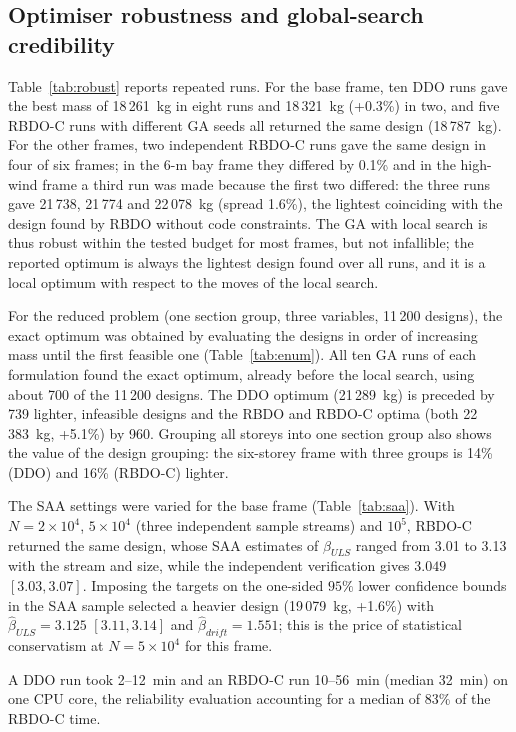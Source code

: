 \subsection{Optimiser robustness and global-search credibility}\label{sec:robust}

Table~\ref{tab:robust} reports repeated runs. For the base frame, ten DDO runs gave the best mass
of 18\,261~kg in eight runs and 18\,321~kg (+0.3\%) in two, and five RBDO-C runs with different
GA seeds all returned the same design (18\,787~kg). For the other frames, two independent
RBDO-C runs gave the same design in four of six frames; in the 6-m bay frame they differed by
0.1\% and in the high-wind frame a third run was made because the first two differed: the three
runs gave 21\,738, 21\,774 and 22\,078~kg (spread 1.6\%), the lightest coinciding with the design
found by RBDO without code constraints. The GA with local search is thus robust within the
tested budget for most frames, but not infallible; the reported optimum is always the lightest
design found over all runs, and it is a local optimum with respect to the moves of the local search.

For the reduced problem (one section group, three variables, 11\,200 designs), the exact optimum
was obtained by evaluating the designs in order of increasing mass until the first feasible one
(Table~\ref{tab:enum}). All ten GA runs of each formulation found the exact optimum, already
before the local search, using about 700 of the 11\,200 designs. The DDO optimum (21\,289~kg) is
preceded by 739 lighter, infeasible designs and the RBDO and RBDO-C optima (both 22\,383~kg,
+5.1\%) by 960. Grouping all storeys into one section group also shows the value of the design
grouping: the six-storey frame with three groups is 14\% (DDO) and 16\% (RBDO-C) lighter.

The SAA settings were varied for the base frame (Table~\ref{tab:saa}). With $N=2\times10^4$,
$5\times10^4$ (three independent sample streams) and $10^5$, RBDO-C returned the same design, whose
SAA estimates of $\beta_{ULS}$ ranged from 3.01 to 3.13 with the stream and size, while the
independent verification gives $3.049$ $[3.03, 3.07]$. Imposing the targets on the one-sided
$95\%$ lower confidence bounds in the SAA sample selected a heavier design (19\,079~kg, +1.6\%)
with $\hat\beta_{ULS}=3.125$ $[3.11, 3.14]$ and $\hat\beta_{drift}=1.551$; this is the price of
statistical conservatism at $N=5\times10^4$ for this frame.

A DDO run took 2--12~min and an RBDO-C run 10--56~min (median 32~min) on one CPU core, the
reliability evaluation accounting for a median of 83\% of the RBDO-C time.

